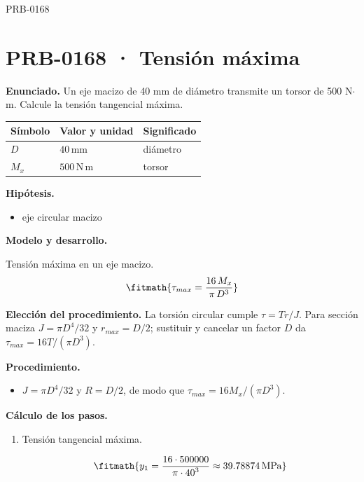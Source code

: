 \Needspace{.3\textheight}

\begin{studiumworked}{PRB-0168}

\section{PRB-0168 · Tensión máxima}

\textbf{Enunciado.} Un eje macizo de 40 mm de diámetro transmite un torsor de 500 N$\cdot$m. Calcule la tensión tangencial máxima.

\par\medskip\noindent\begin{tabular}{@{}p{.18\linewidth}p{.26\linewidth}p{.48\linewidth}@{}}
\toprule Símbolo & Valor y unidad & Significado\\\midrule
$D$ & $40\,\mathrm{mm}$ & diámetro\\
$M_{x}$ & $500\,\mathrm{N\,m}$ & torsor\\
\bottomrule\end{tabular}\par\medskip

\textbf{Hipótesis.}\begin{itemize}\item eje circular macizo\end{itemize}

\textbf{Modelo y desarrollo.}

Tensión máxima en un eje macizo.\[\fitmath{\tau_{max} = \frac{16\,M_x}{\pi\,D^{3}}}\]

\textbf{Elección del procedimiento.} La torsión circular cumple $\tau=Tr/J$. Para sección maciza $J=\pi D^4/32$ y $r_{max}=D/2$; sustituir y cancelar un factor $D$ da $\tau_{max}=16T/(\pi D^3)$.

\textbf{Procedimiento.}\begin{itemize}\item $J = \pi D^4/32$ y $R = D/2$, de modo que $\tau_{max} = 16 M_x/(\pi D^3)$.\end{itemize}

\textbf{Cálculo de los pasos.}

\begin{enumerate}

\item Tensión tangencial máxima.

\[\fitmath{y_{1}=\frac{16\cdot 500000}{\pi\cdot {40}^{3}}\approx 39.78874\,\mathrm{MPa}}\]

\end{enumerate}


\end{studiumworked}
